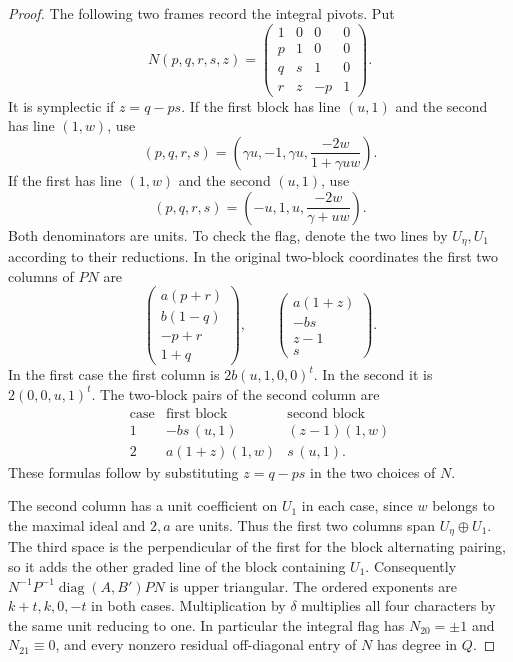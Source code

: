 \begin{proof}
The following two frames record the integral pivots. Put
\[
 N(p,q,r,s,z)=
 \begin{pmatrix}
 1&0&0&0\\ p&1&0&0\\ q&s&1&0\\ r&z&-p&1
 \end{pmatrix}.
\]
It is symplectic if \(z=q-ps\). If the first block has
line \((u,1)\) and the second has line \((1,w)\), use
\[
 (p,q,r,s)=\left(\gamma u,-1,\gamma u,
                \frac{-2w}{1+\gamma uw}\right).
\]
If the first has line \((1,w)\) and the second \((u,1)\), use
\[
 (p,q,r,s)=\left(-u,1,u,\frac{-2w}{\gamma+uw}\right).
\]
Both denominators are units. To check the flag, denote the
two lines by \(U_\eta,U_1\) according to their reductions.
In the original two-block coordinates the first two columns of
\(PN\) are
\[
 \begin{pmatrix}a(p+r)\\ b(1-q)\\ -p+r\\ 1+q\end{pmatrix},
 \qquad
 \begin{pmatrix}a(1+z)\\ -bs\\ z-1\\ s\end{pmatrix}.
\]
In the first case the first column is \(2b(u,1,0,0)^t\).
In the second it is \(2(0,0,u,1)^t\).
The two-block pairs of the second column are
\[
 \begin{array}{c|cc}
 \text{case}&\text{first block}&\text{second block}\\ \hline
 1&-bs\,(u,1)&(z-1)(1,w)\\
 2&a(1+z)(1,w)&s\,(u,1).
 \end{array}
\]
These formulas follow by substituting \(z=q-ps\) in the two
choices of \(N\).

The second column has a unit
coefficient on \(U_1\) in each case, since \(w\) belongs to
the maximal ideal and \(2,a\) are units. Thus the first two
columns span \(U_\eta\oplus U_1\).
The third space is the perpendicular of the first for the
block alternating pairing, so it adds the other graded
line of the block containing \(U_1\). Consequently
\(N^{-1}P^{-1}\operatorname{diag}(A,B')PN\) is upper
triangular. The ordered exponents are \(k+t,k,0,-t\) in
both cases. Multiplication by \(\delta\) multiplies all four
characters by the same unit reducing to one. In particular
the integral flag has \(N_{20}=\pm1\) and
\(N_{21}\equiv0\), and every nonzero residual off-diagonal
entry of \(N\) has degree in \(Q\).

\end{proof}

